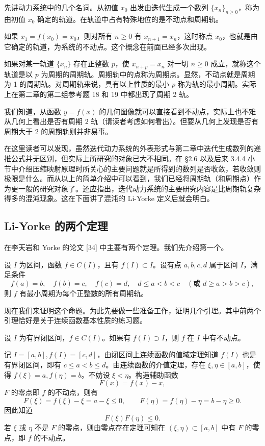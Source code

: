 先讲动力系统中的几个名词。从初值 $x_0$ 出发由迭代生成一个数列 $\{x_n\}_{n\ge0}$，称为由初值 $x_0$ 确定的轨道。在轨道中占有特殊地位的是不动点和周期轨。

如果 $x_1=f(x_0)=x_0$，则对所有 $n\ge0$ 有 $x_{n+1}=x_n$，这时称点 $x_0$，也就是由它确定的轨道，为系统的不动点。这个概念在前面已经多次出现。

如果对某一轨道 $\{x_n\}$ 存在正整数 $p$，使 $x_{n+p}=x_n$ 对一切 $n\ge0$ 成立，就称这个轨道是以 $p$ 为周期的周期轨。周期轨中的点称为周期点。显然，不动点就是周期为 1 的周期轨。对周期轨来说，具有以上性质的最小 $p$ 称为轨的最小周期。实际上在第二章的第二组参考题 18 和 19 中都出现了周期 2 轨。

我们知道，从函数 $y=f(x)$ 的几何图像就可以直接看到不动点，实际上也不难从几何上看出是否有周期 2 轨（请读者考虑如何看出）。但要从几何上发现是否有周期大于 2 的周期轨则并非易事。

\begin{xremark}
在这里读者可以发现，虽然迭代动力系统的外表形式与第二章中迭代生成数列的递推公式并无区别，但实际上所研究的对象已大不相同。在 §2.6 以及后来 3.4.4 小节中介绍压缩映射原理时所关心的主要问题就是所得到的数列是否收敛，若收敛则极限是什么。而从以上的简单介绍中可以看到，我们已经将周期轨（和周期点）作为更一般的研究对象了。还应指出，迭代动力系统的主要研究内容是比周期轨复杂得多的混沌现象。这在下面讲了混沌的 Li-Yorke 定义后就会明白。
\end{xremark}

\subsection{Li-Yorke 的两个定理}

在李天岩和 Yorke 的论文 [34] 中主要有两个定理。我们先介绍第一个。

\begin{xproposition}
设 $I$ 为区间，函数 $f\in C(I)$，且有 $f(I)\subset I$。设有点 $a,b,c,d$ 属于区间 $I$，满足条件
\[
  f(a)=b,\quad f(b)=c,\quad f(c)=d,\quad d\le a<b<c\quad(\text{或 }d\ge a>b>c),
\]
则 $f$ 有最小周期为每个正整数的所有周期轨。
\end{xproposition}

现在我们来证明这个命题。为此先要做一些准备工作，证明几个引理。其中前两个引理恰好是关于连续函数基本性质的练习题。

\begin{xexample}[5.6.1（引理 1）]
设 $I$ 为有界闭区间，$f\in C(I)$。如果有 $f(I)\supset I$，则 $f$ 在 $I$ 中有不动点。
\end{xexample}
\begin{xproof}
记 $I=[a,b],f(I)=[c,d]$，由闭区间上连续函数的值域定理知道 $f(I)$ 也是有界闭区间，即有 $c\le a<b\le d$。由连续函数的介值定理，存在 $\xi,\eta\in[a,b]$，使得 $f(\xi)=a,f(\eta)=b$。不妨设 $\xi<\eta$。构造辅助函数
\[
  F(x)=f(x)-x,
\]
$F$ 的零点即 $f$ 的不动点，则有
\[
  F(\xi)=f(\xi)-\xi=a-\xi\le0,\qquad F(\eta)=f(\eta)-\eta=b-\eta\ge0.
\]
因此知道
\[
  F(\xi)F(\eta)\le0.
\]
若 $\xi$ 或 $\eta$ 不是 $F$ 的零点，则由零点存在定理可知在 $(\xi,\eta)\subset[a,b]$ 中有 $F$ 的零点，即 $f$ 的不动点。
\end{xproof}

